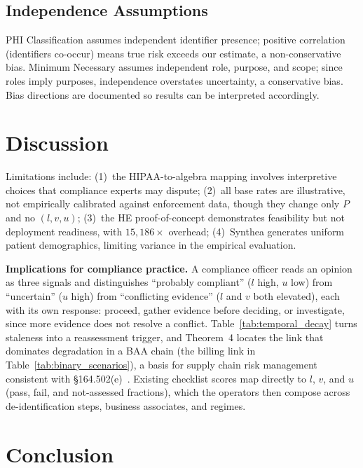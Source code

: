 \documentclass[conference]{IEEEtran}
\begin{document}
\subsection{Independence Assumptions}
\label{sec:independence}

PHI Classification assumes independent identifier presence; positive correlation (identifiers co-occur) means true risk exceeds our estimate, a non-conservative bias. Minimum Necessary assumes independent role, purpose, and scope; since roles imply purposes, independence overstates uncertainty, a conservative bias. Bias directions are documented so results can be interpreted accordingly.

\section{Discussion}
\label{sec:discussion}

Limitations include: (1)~the HIPAA-to-algebra mapping involves interpretive choices that compliance experts may dispute; (2)~all base rates are illustrative, not empirically calibrated against enforcement data, though they change only $P$ and no $(l, v, u)$; (3)~the HE proof-of-concept demonstrates feasibility but not deployment readiness, with $15{,}186\times$ overhead; (4)~Synthea generates uniform patient demographics, limiting variance in the empirical evaluation.

\textbf{Implications for compliance practice.} A compliance officer reads an opinion as three signals and distinguishes ``probably compliant'' ($l$ high, $u$ low) from ``uncertain'' ($u$ high) from ``conflicting evidence'' ($l$ and $v$ both elevated), each with its own response: proceed, gather evidence before deciding, or investigate, since more evidence does not resolve a conflict. Table~\ref{tab:temporal_decay} turns staleness into a reassessment trigger, and Theorem~4 locates the link that dominates degradation in a BAA chain (the billing link in Table~\ref{tab:binary_scenarios}), a basis for supply chain risk management consistent with \S164.502(e)~\cite{hipaa_privacy}. Existing checklist scores map directly to $l$, $v$, and $u$ (pass, fail, and not-assessed fractions), which the operators then compose across de-identification steps, business associates, and regimes.

\section{Conclusion}
\end{document}
